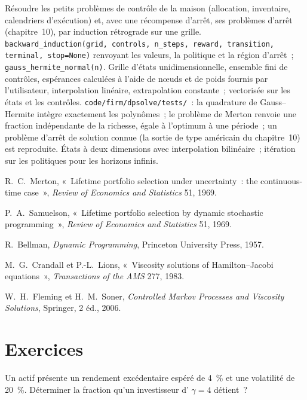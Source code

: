 \begin{build}
 Résoudre les petits problèmes de contrôle de la maison (allocation, inventaire, calendriers d'exécution) et, avec une
récompense d'arrêt, ses problèmes d'arrêt (chapitre~10), par induction rétrograde sur une grille.
 \texttt{backward\_induction(grid, controls, n\_steps, reward, transition, terminal, stop=None)}
renvoyant les valeurs, la politique et la région d'arrêt~; \texttt{gauss\_hermite\_normal(n)}.
 Grille d'états unidimensionnelle, ensemble fini de contrôles, espérances calculées à l'aide de nœuds et de poids fournis par l'utilisateur, interpolation
linéaire, extrapolation constante~; vectorisée sur les états et les contrôles.
 \texttt{code/firm/dpsolve/tests/}~: la quadrature de Gauss--Hermite intègre exactement les polynômes~; le problème
de Merton renvoie une fraction indépendante de la richesse, égale à l'optimum à une période~; un problème d'arrêt de
solution connue (la sortie de type américain du chapitre~10) est reproduite.
 États à deux dimensions avec interpolation bilinéaire~; itération sur les politiques pour les horizons infinis.
\end{build}

\begin{omsources}
\item R.~C.~Merton, «~Lifetime portfolio selection under uncertainty~: the continuous-time case~», \emph{Review of
Economics and Statistics} 51, 1969.
\item P.~A.~Samuelson, «~Lifetime portfolio selection by dynamic stochastic programming~», \emph{Review of Economics and
Statistics} 51, 1969.
\item R.~Bellman, \emph{Dynamic Programming}, Princeton University Press, 1957.
\item M.~G.~Crandall et P.-L.~Lions, «~Viscosity solutions of Hamilton--Jacobi equations~», \emph{Transactions of the
AMS} 277, 1983.
\item W.~H.~Fleming et H.~M.~Soner, \emph{Controlled Markov Processes and Viscosity Solutions}, Springer, 2 éd., 2006.
\end{omsources}

\section{Exercices}

\begin{exercise}[$\star$]\label{exo:qm:stochastic-control:1}
Un actif présente un rendement excédentaire espéré de 4~\% et une volatilité de 20~\%. Déterminer la fraction qu'un investisseur
d' $\gamma = 4$ détient~?
\end{exercise}

